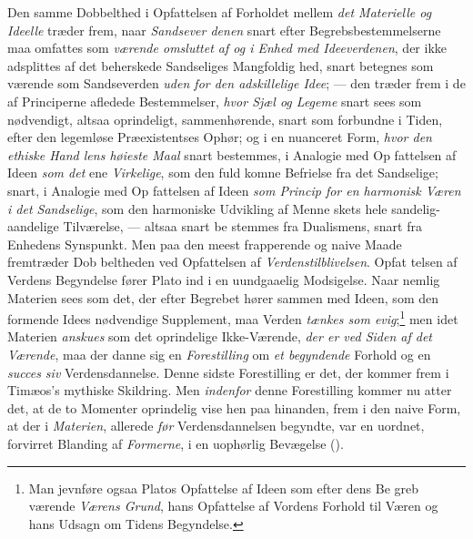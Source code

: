 Den samme Dobbelthed i Opfattelsen af Forholdet mellem
\emph{det Materielle og Ideelle} træder frem, naar \emph{Sandsever\-%
denen} snart efter Begrebsbestemmelserne maa omfattes som
\emph{værende omsluttet af og i Enhed med Ideeverdenen},
der ikke adsplittes af det beherskede Sandseliges Mangfoldig\-%
hed, snart betegnes som værende som Sandseverden \emph{uden\-%
for den adskillelige Idee}; --- den træder frem i de af
Principerne afledede Bestemmelser, \emph{hvor Sjæl og Legeme}
snart sees som nødvendigt, altsaa oprindeligt, sammenhørende,
snart som forbundne i Tiden, efter den legemløse Præexistentses
Ophør; og i en nuanceret Form, \emph{hvor den ethiske Hand\-%
lens høieste Maal} snart bestemmes, i Analogie med Op\-%
fattelsen af Ideen \emph{som det} ene \emph{Virkelige}, som den fuld\-%
komne Befrielse fra det Sandselige; snart, i Analogie med Op\-%
fattelsen af Ideen \emph{som Princip for en harmonisk Væren
i det Sandselige}, som den harmoniske Udvikling af Menne\-%
skets hele sandelig-aandelige Tilværelse, --- altsaa snart be\-%
stemmes fra Dualismens, snart fra Enhedens Synspunkt. Men
paa den meest frapperende og naive Maade fremtræder Dob\-%
beltheden ved Opfattelsen af \emph{Verdenstilblivelsen}. Opfat\-%
telsen af Verdens Begyndelse fører Plato ind i en uundgaaelig
 \setcounter{footnote}{0}
Modsigelse. Naar nemlig Materien sees som det, der efter
Begrebet hører sammen med Ideen, som den formende Idees
nødvendige Supplement, maa Verden \emph{tænkes som evig};\footnote{Man
jevnføre ogsaa Platos Opfattelse af Ideen som efter dens Be\-%
greb værende \emph{Værens Grund}, hans Opfattelse af Vordens Forhold til
Væren og hans Udsagn om Tidens Begyndelse.}
men idet Materien \emph{anskues} som det oprindelige Ikke-Værende,
\emph{der er ved Siden af det Værende}, maa der danne sig en
\emph{Forestilling} om \emph{et begyndende} Forhold og en \emph{succes\-%
siv} Verdensdannelse. Denne sidste Forestilling er det, der
kommer frem i Timæos's mythiske Skildring. Men \emph{indenfor}
denne Forestilling kommer nu atter det, at de to Momenter
oprindelig vise hen paa hinanden, frem i den naive Form, at
der i \emph{Materien}, allerede \emph{før} Verdensdannelsen begyndte, var
en uordnet, forvirret Blanding af \emph{Formerne}, i en uophørlig
Bevægelse ().

